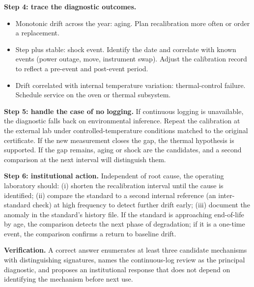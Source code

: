 \begin{exercise}
\textbf{Step 4: trace the diagnostic outcomes.}
\begin{itemize}
  \item Monotonic drift across the year: aging. Plan recalibration
  more often or order a replacement.
  \item Step plus stable: shock event. Identify the date and
  correlate with known events (power outage, move, instrument
  swap). Adjust the calibration record to reflect a pre-event and
  post-event period.
  \item Drift correlated with internal temperature variation:
  thermal-control failure. Schedule service on the oven or thermal
  subsystem.
\end{itemize}

\textbf{Step 5: handle the case of no logging.} If continuous
logging is unavailable, the diagnostic falls back on environmental
inference. Repeat the calibration at the external lab under
controlled-temperature conditions matched to the original
certificate. If the new measurement closes the gap, the thermal
hypothesis is supported. If the gap remains, aging or shock are the
candidates, and a second comparison at the next interval will
distinguish them.

\textbf{Step 6: institutional action.} Independent of root cause,
the operating laboratory should: (i) shorten the recalibration
interval until the cause is identified; (ii) compare the standard
to a second internal reference (an inter-standard check) at high
frequency to detect further drift early; (iii) document the
anomaly in the standard's history file. If the standard is
approaching end-of-life by age, the comparison detects the next
phase of degradation; if it is a one-time event, the comparison
confirms a return to baseline drift.

\textbf{Verification.} A correct answer enumerates at least three
candidate mechanisms with distinguishing signatures, names the
continuous-log review as the principal diagnostic, and proposes
an institutional response that does not depend on identifying the
mechanism before next use.
\end{exercise}

